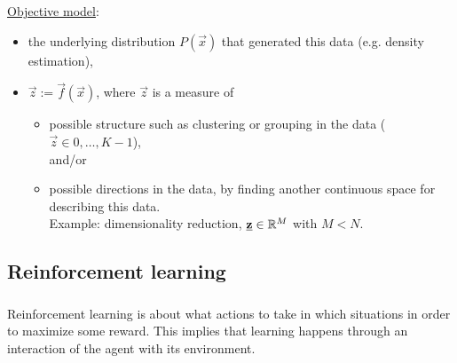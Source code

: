\begin{frame}

\underline{Objective model}:
\begin{itemize}
\item the underlying distribution $P(\vec x)$ that generated this data (e.g. density estimation),
\item $\vec z := \vec f(\vec x)$, where $\vec z$ is a measure of 
\begin{itemize}
\item possible structure such as clustering or grouping in the data ($\vec z \in {0,\ldots,K-1}$), \\

and/or

\item possible directions in the data, by finding another continuous space for describing this data. \\

Example: dimensionality reduction, $\underline{\mathbf{z}} \in \mathbb{R}^M$ with $M < N$.

\end{itemize}
\end{itemize}

\end{frame}

\newpage

\subsection{Reinforcement learning} \label{sec:reinforcement}

\begin{frame}\frametitle{\subsecname}

Reinforcement learning is about what actions to take in which situations in order to maximize some reward.
This implies that learning happens through an interaction of the agent with its environment.

\end{frame}


